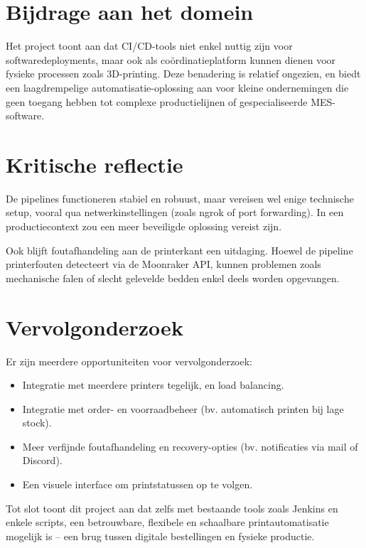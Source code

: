 \section*{Bijdrage aan het domein}

Het project toont aan dat CI/CD-tools niet enkel nuttig zijn voor softwaredeployments, maar ook als coördinatieplatform kunnen dienen voor fysieke processen zoals 3D-printing. Deze benadering is relatief ongezien, en biedt een laagdrempelige automatisatie-oplossing aan voor kleine ondernemingen die geen toegang hebben tot complexe productielijnen of gespecialiseerde MES-software.

\section*{Kritische reflectie}

De pipelines functioneren stabiel en robuust, maar vereisen wel enige technische setup, vooral qua netwerkinstellingen (zoals ngrok of port forwarding). In een productiecontext zou een meer beveiligde oplossing vereist zijn.

Ook blijft foutafhandeling aan de printerkant een uitdaging. Hoewel de pipeline printerfouten detecteert via de Moonraker API, kunnen problemen zoals mechanische falen of slecht gelevelde bedden enkel deels worden opgevangen.

\section*{Vervolgonderzoek}

Er zijn meerdere opportuniteiten voor vervolgonderzoek:

\begin{itemize}
    \item Integratie met meerdere printers tegelijk, en load balancing.
    \item Integratie met order- en voorraadbeheer (bv. automatisch printen bij lage stock).
    \item Meer verfijnde foutafhandeling en recovery-opties (bv. notificaties via mail of Discord).
    \item Een visuele interface om printstatussen op te volgen.
\end{itemize}

\bigskip

Tot slot toont dit project aan dat zelfs met bestaande tools zoals Jenkins en enkele scripts, een betrouwbare, flexibele en schaalbare printautomatisatie mogelijk is – een brug tussen digitale bestellingen en fysieke productie.


